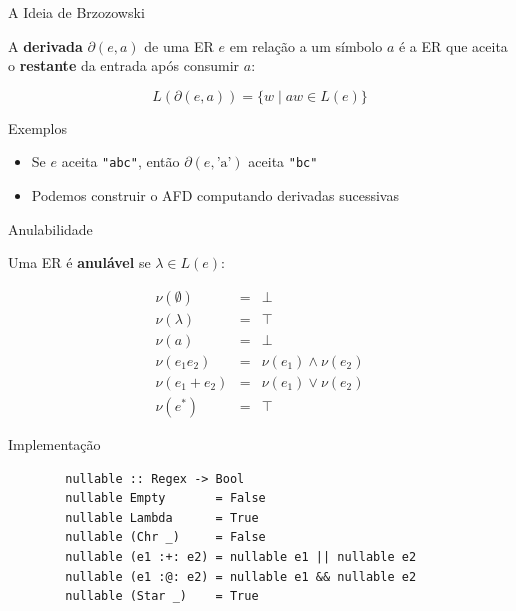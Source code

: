 \begin{frame}{A Ideia de Brzozowski}

    A \textbf{derivada} \(\partial(e, a)\) de uma ER \(e\) em relação a um
    símbolo \(a\) é a ER que aceita o \textbf{restante} da entrada após
    consumir \(a\):

    \[L(\partial(e, a)) = \{w \mid aw \in L(e)\}\]
\end{frame}

\begin{frame}[fragile]{Exemplos}

    \begin{itemize}

        \item
        Se \(e\) aceita \texttt{"abc"}, então
        \(\partial(e, \text{'a'})\) aceita \texttt{"bc"}
        \item
        Podemos construir o AFD computando derivadas sucessivas
    \end{itemize}
\end{frame}

\begin{frame}{Anulabilidade}

    Uma ER é \textbf{anulável} se \(\lambda \in L(e)\):

    \[\begin{array}{lcl}
    \nu(\emptyset) &=& \bot \\
    \nu(\lambda) &=& \top \\
    \nu(a) &=& \bot \\
    \nu(e_1 e_2) &=& \nu(e_1) \land \nu(e_2) \\
    \nu(e_1 + e_2) &=& \nu(e_1) \lor \nu(e_2) \\
    \nu(e^*) &=& \top
\end{array}\]
\end{frame}

\begin{frame}[fragile]{Implementação}

    \begin{lstlisting}
        nullable :: Regex -> Bool
        nullable Empty       = False
        nullable Lambda      = True
        nullable (Chr _)     = False
        nullable (e1 :+: e2) = nullable e1 || nullable e2
        nullable (e1 :@: e2) = nullable e1 && nullable e2
        nullable (Star _)    = True
    \end{lstlisting}
\end{frame}


